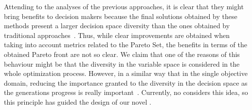 Attending to the analyses of the previous approaches, it is clear that they might bring benefits to decision makers
because the final solutions obtained by these methods present a larger decision space diversity than the ones obtained
by traditional approaches~\cite{deb2005omni, rudolph2007capabilities}.
%
Thus, while clear improvements are obtained when taking into account metrics related to the Pareto Set, the benefits in terms of the 
obtained Pareto front are not so clear.
%
We claim that one of the reasons of this behaviour might be that the diversity in the variable space is considered 
in the whole optimization process.
%
However, in a similar way that in the single objective domain, reducing the importance granted to the diversity in the decision space as the generations progress is really important~\cite{Joel:MULTI_DYNAMIC}.
%
Currently, no \MOEA{} considers this idea, so this principle has guided the design of our novel \MOEA{}.
